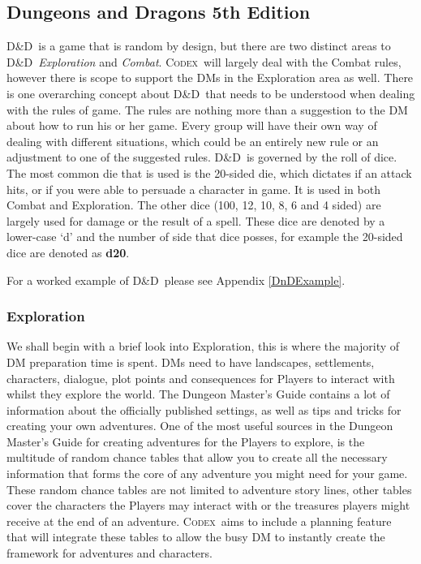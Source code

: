 \documentclass[review]{cmpreport}
\newcommand{\dnd}{D\&D}
\newcommand{\Codex}{\textsc{Codex}}
\begin{document}
	\subsection{Dungeons and Dragons 5th Edition}
	\dnd \ is a game that is random by design, but there are two distinct areas to \dnd \, \emph{Exploration} and \emph{Combat}. \Codex \ will largely deal with the Combat rules, however there is scope to support the DMs in the Exploration area as well. There is one overarching concept about \dnd \ that needs to be understood when dealing with the rules of game. The rules are nothing more than a suggestion to the DM about how to run his or her game. Every group will have their own way of dealing with different situations, which could be an entirely new rule or an adjustment to one of the suggested rules. \dnd \ is governed by the roll of dice. The most common die that is used is the 20-sided die, which dictates if an attack hits, or if you were able to persuade a character in game. It is used in both Combat and Exploration. The other dice (100, 12, 10, 8, 6 and 4 sided) are largely used for damage or the result of a spell. These dice are denoted by a lower-case `d' and the number of side that dice posses, for example the 20-sided dice are denoted as \textbf{d20}.
	
	For a worked example of \dnd \ please see Appendix \ref{DnDExample}.
	
	\subsubsection{Exploration}
	We shall begin with a brief look into Exploration, this is where the majority of DM preparation time is spent. DMs need to have landscapes, settlements, characters, dialogue, plot points and consequences for Players to interact with whilst they explore the world. The Dungeon Master's Guide \cite{DMGuide} contains a lot of information about the officially published settings, as well as tips and tricks for creating your own adventures. One of the most useful sources in the Dungeon Master's Guide for creating adventures for the Players to explore, is the multitude of random chance tables that allow you to create all the necessary information that forms the core of any adventure you might need for your game. These random chance tables are not limited to adventure story lines, other tables cover the characters the Players may interact with or the treasures players might receive at the end of an adventure. \Codex \ aims to include a planning feature that will integrate these tables to allow the busy DM to instantly create the framework for adventures and characters. 
	
\end{document}
